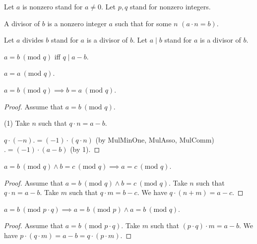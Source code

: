 \documentclass[english]{article}
\renewcommand{\mod}{\text{mod }}
\begin{document}
  \begin{forthel}
    Let $a$ is nonzero stand for $a \neq 0$.
    Let $p,q$ stand for nonzero integers.

    \begin{definition}\label{Divisor}
      A divisor of $b$ is a nonzero integer $a$ such that for some $n$ $(a \cdot n = b)$.
    \end{definition}

    Let $a$ divides $b$ stand for $a$ is a divisor of $b$.
    Let $a \mid b$ stand for $a$ is a divisor of $b$.

    \begin{definition}\label{EquMod}
      $a = b ~(\mod q)$ iff $q \mid a-b$.
    \end{definition}

    \begin{lemma}\label{EquModRef}
      $a = a ~(\mod q)$.
    \end{lemma}

    \begin{lemma}\label{EquModSym}
      $a = b ~(\mod q) \implies b = a ~(\mod q)$.
    \end{lemma}
    \begin{proof}
      Assume that $a = b ~(\mod q)$.

      (1) Take $n$ such that $q \cdot n = a - b$.

      $q \cdot (-n) .= (-1) \cdot (q \cdot n)$ (by MulMinOne, MulAsso, MulComm) $.= (-1) \cdot (a - b)$ (by 1).
    \end{proof}

    \begin{lemma}\label{EquModTrn}
      $a = b ~(\mod q) \wedge b = c ~(\mod q) \implies a = c ~(\mod q)$.
    \end{lemma}
    \begin{proof}
      Assume that $a = b ~(\mod q) \wedge b = c ~(\mod q)$.
      Take $n$ such that $q \cdot n = a - b$.
      Take $m$ such that $q \cdot m = b - c$.
      We have $q \cdot (n + m) = a - c$.
    \end{proof}

    \begin{lemma}\label{EquModMul}
      $a = b ~(\mod p \cdot q) \implies a = b ~(\mod p) \wedge a = b ~(\mod q)$.
    \end{lemma}
    \begin{proof}
      Assume that $a = b ~(\mod p \cdot q)$.
      Take $m$ such that $(p \cdot q) \cdot m = a - b$.
      We have $p \cdot (q \cdot m) = a - b = q \cdot (p \cdot m)$.
    \end{proof}
  \end{forthel}
\end{document}
